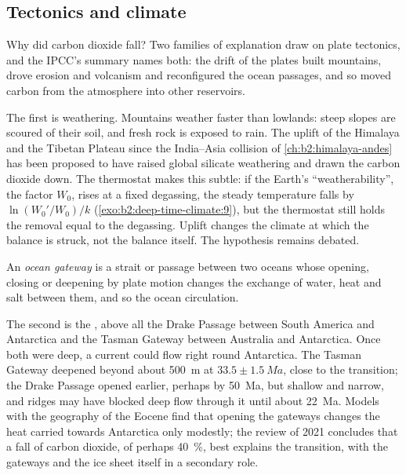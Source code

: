 \subsection*{Tectonics and climate}

Why did carbon dioxide fall? Two families of explanation draw on plate tectonics, and the IPCC's
summary names both: the drift of the plates built mountains, drove erosion and volcanism and
reconfigured the ocean passages, and so moved carbon from the atmosphere into other reservoirs.

The first is weathering. Mountains weather faster than lowlands: steep slopes are scoured of their
soil, and fresh rock is exposed to rain. The uplift of the Himalaya and the Tibetan Plateau since
the India--Asia collision of \cref{ch:b2:himalaya-andes} has been proposed to have raised global
silicate weathering and drawn the carbon dioxide down. The thermostat makes this subtle: if the
Earth's ``weatherability'', the factor $W_0$, rises at a fixed degassing, the steady temperature
falls by $\ln(W_0'/W_0)/k$ (\cref{exo:b2:deep-time-climate:9}), but the thermostat still holds the
removal equal to the degassing. Uplift changes the climate at which the balance is struck, not the
balance itself. The hypothesis remains debated.

\begin{definition}\label{def:b2:deep-time-climate:gateway}
An \emph{ocean gateway} is a strait or passage between two oceans whose opening,
closing or deepening by plate motion changes the exchange of water, heat and salt between them, and
so the ocean circulation.
\end{definition}

The second is the , above all the Drake Passage between South America and Antarctica
and the Tasman Gateway between Australia and Antarctica. Once both were deep, a current could flow
right round Antarctica. The Tasman Gateway deepened beyond about \qty{500}{m} at $33.5 \pm
\qty{1.5}{Ma}$, close to the transition; the Drake Passage opened earlier, perhaps by \qty{50}{Ma},
but shallow and narrow, and ridges may have blocked deep flow through it until about \qty{22}{Ma}. Models with
the geography of the Eocene find that opening the gateways changes the heat carried towards
Antarctica only modestly; the review of 2021 concludes that a fall of carbon dioxide, of perhaps
\qty{40}{\percent}, best explains the transition, with the gateways and the ice sheet itself in a
secondary role.

